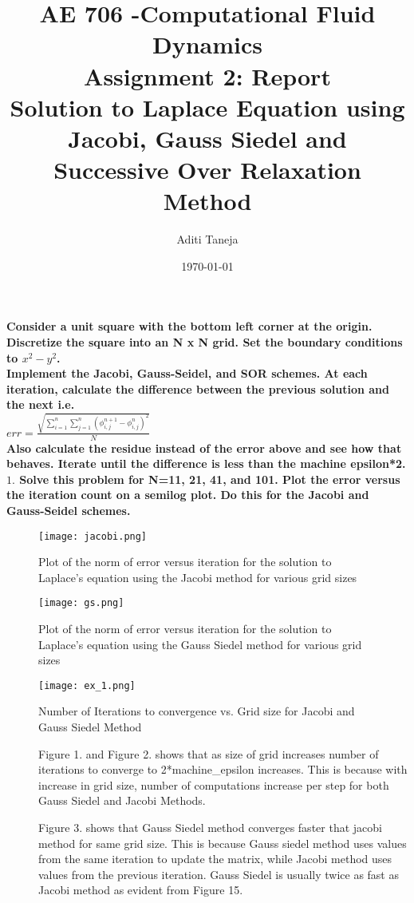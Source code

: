 \documentclass{article}
\title{AE 706 -Computational Fluid Dynamics \\ Assignment 2: Report \\ Solution to Laplace Equation using Jacobi, Gauss Siedel and Successive Over Relaxation Method}
\author{Aditi Taneja}
\date{\today}
\begin{document}
\maketitle

\textbf{Consider a unit square with the bottom left corner at the origin. Discretize the square into an N x N grid. Set the boundary conditions to $x^2 - y^2$. \\ Implement the Jacobi, Gauss-Seidel, and SOR schemes. At each iteration, calculate the difference between the previous solution and the next i.e.}
\\

$err= \frac{\sqrt{\sum_{i=1}^{n}\sum_{j=1}^{n}{(\phi^{n+1}_{i,j} - \phi^{n}_{i,j})^2}}}{N}$
 \\
\textbf{Also calculate the residue instead of the error above and see how that behaves. Iterate until the difference  is less than the machine epsilon*2. \\}
\newpage
\textbf{$1.$ Solve this problem for N=11, 21, 41, and 101. Plot the error versus the iteration count on a semilog plot. Do this for the Jacobi and Gauss-Seidel schemes. }

\begin{figure}[H] \label{figure}
\texttt{[image: jacobi.png]}
\label{figure:}
\caption{Plot of the norm of error versus iteration for the solution to Laplace’s equation using the Jacobi method for various grid sizes}
\end{figure}

\begin{figure}[H] \label{figure}
\texttt{[image: gs.png]}
\label{figure:}
\caption{Plot of the norm of error versus iteration for the solution to Laplace’s equation using the Gauss Siedel method for various grid sizes}
\end{figure}

\begin{figure}[H] \label{figure}
\texttt{[image: ex\_1.png]}
\caption{Number of Iterations to convergence vs. Grid size for Jacobi and Gauss Siedel Method}
\label{figure:}
\end{figure}

\begin{description}
\item[]Figure 1. and Figure 2. shows that as size of grid increases number of iterations to converge to 2*machine\_epsilon increases. This is because with increase in grid size, number of computations increase per step for both Gauss Siedel and Jacobi Methods.

\item[]Figure 3. shows that Gauss Siedel method converges faster that jacobi method for same grid size. This is because Gauss siedel method uses values from the same iteration to update the matrix, while Jacobi method uses values from the previous iteration. Gauss Siedel is usually twice as fast as Jacobi method as evident from Figure 15. 
\end{description}
\end{document}
